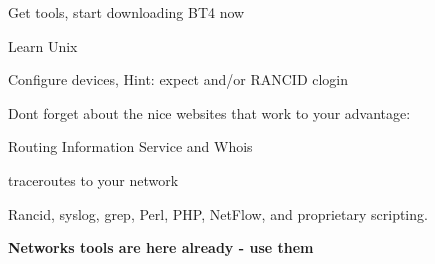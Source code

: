 \documentclass[28pt,landscape,a4paper,footrule]{foils}
\begin{document}

\begin{slidelist}
\item Get tools, start downloading BT4 now
\item Learn Unix
\item Configure devices, Hint: expect and/or RANCID clogin
\end{slidelist}



\begin{slidelist}
\item Dont forget about the nice websites that work to your advantage:
\item {} Routing Information Service and Whois
\item {} traceroutes to your network
\end{slidelist}

\slide{}

Rancid, syslog, grep, Perl, PHP, NetFlow, and proprietary scripting.





\myquestionspage
\vskip 5mm
\centerline{\color{titlecolor}\Large \bf Networks tools are here already - use them}


\hlkprofiluk
\end{document}
